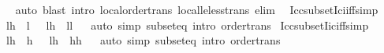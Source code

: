 \begin{isabellebody}
%
\isadelimproof
\ \ %
\endisadelimproof
%
\isatagproof
{}\isamarkupfalse%
\ auto\ {\isacharparenleft}{\kern0pt}blast\ intro{\isacharcolon}{\kern0pt}\ local{\isachardot}{\kern0pt}order{\isacharunderscore}{\kern0pt}trans\ local{\isachardot}{\kern0pt}le{\isacharunderscore}{\kern0pt}less{\isacharunderscore}{\kern0pt}trans\ elim{\isacharcolon}{\kern0pt}\ {\isacharparenright}{\kern0pt}{\isacharplus}{\kern0pt}%
\endisatagproof
{\isafoldproof}%
%
\isadelimproof
\isanewline
%
\endisadelimproof
\isanewline
{}\isamarkupfalse%
\ Icc{\isacharunderscore}{\kern0pt}subset{\isacharunderscore}{\kern0pt}Ici{\isacharunderscore}{\kern0pt}iff{\isacharbrackleft}{\kern0pt}simp{\isacharbrackright}{\kern0pt}{\isacharcolon}{\kern0pt}\isanewline
\ \ {\isachardoublequoteopen}{\isacharbraceleft}{\kern0pt}l{\isachardot}{\kern0pt}{\isachardot}{\kern0pt}h{\isacharbraceright}{\kern0pt}\ {\isasymsubseteq}\ {\isacharbraceleft}{\kern0pt}l{\isacharprime}{\kern0pt}{\isachardot}{\kern0pt}{\isachardot}{\kern0pt}{\isacharbraceright}{\kern0pt}\ {\isacharequal}{\kern0pt}\ {\isacharparenleft}{\kern0pt}{\isasymnot}\ l{\isasymle}h\ {\isasymor}\ l{\isasymge}l{\isacharprime}{\kern0pt}{\isacharparenright}{\kern0pt}{\isachardoublequoteclose}\isanewline
%
\isadelimproof
\ \ %
\endisadelimproof
%
\isatagproof
{}\isamarkupfalse%
{\isacharparenleft}{\kern0pt}auto\ simp{\isacharcolon}{\kern0pt}\ subset{\isacharunderscore}{\kern0pt}eq\ intro{\isacharcolon}{\kern0pt}\ order{\isacharunderscore}{\kern0pt}trans{\isacharparenright}{\kern0pt}%
\endisatagproof
{\isafoldproof}%
%
\isadelimproof
\isanewline
%
\endisadelimproof
\isanewline
{}\isamarkupfalse%
\ Icc{\isacharunderscore}{\kern0pt}subset{\isacharunderscore}{\kern0pt}Iic{\isacharunderscore}{\kern0pt}iff{\isacharbrackleft}{\kern0pt}simp{\isacharbrackright}{\kern0pt}{\isacharcolon}{\kern0pt}\isanewline
\ \ {\isachardoublequoteopen}{\isacharbraceleft}{\kern0pt}l{\isachardot}{\kern0pt}{\isachardot}{\kern0pt}h{\isacharbraceright}{\kern0pt}\ {\isasymsubseteq}\ {\isacharbraceleft}{\kern0pt}{\isachardot}{\kern0pt}{\isachardot}{\kern0pt}h{\isacharprime}{\kern0pt}{\isacharbraceright}{\kern0pt}\ {\isacharequal}{\kern0pt}\ {\isacharparenleft}{\kern0pt}{\isasymnot}\ l{\isasymle}h\ {\isasymor}\ h{\isasymle}h{\isacharprime}{\kern0pt}{\isacharparenright}{\kern0pt}{\isachardoublequoteclose}\isanewline
%
\isadelimproof
\ \ %
\endisadelimproof
%
\isatagproof
{}\isamarkupfalse%
{\isacharparenleft}{\kern0pt}auto\ simp{\isacharcolon}{\kern0pt}\ subset{\isacharunderscore}{\kern0pt}eq\ intro{\isacharcolon}{\kern0pt}\ order{\isacharunderscore}{\kern0pt}trans{\isacharparenright}{\kern0pt}%

\end{isabellebody}
